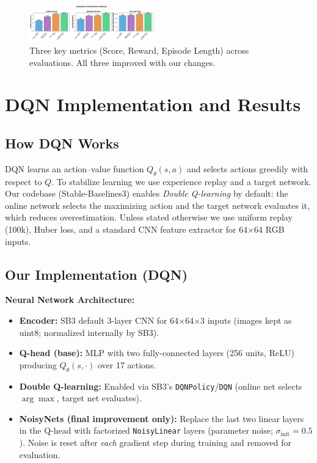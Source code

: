 \documentclass[conference]{IEEEtran}
\begin{document}
\begin{figure}[h!]
\centering
\includegraphics[width=0.48\textwidth]{fig3_summary_metrics.pdf}
\caption{Three key metrics (Score, Reward, Episode Length) across evaluations. All three improved with our changes.}
\label{fig:metrics}
\end{figure}

\section{DQN Implementation and Results}

\subsection{How DQN Works}
DQN learns an action–value function $Q_\theta(s,a)$ and selects actions greedily with respect to $Q$. To stabilize learning we use experience replay and a target network. Our codebase (Stable-Baselines3) enables \emph{Double Q-learning} by default: the online network selects the maximizing action and the target network evaluates it, which reduces overestimation. Unless stated otherwise we use uniform replay (100k), Huber loss, and a standard CNN feature extractor for 64$\times$64 RGB inputs.

\subsection{Our Implementation (DQN)}

\textbf{Neural Network Architecture:}
\begin{itemize}
    \item \textbf{Encoder:} SB3 default 3-layer CNN for 64$\times$64$\times$3 inputs (images kept as uint8; normalized internally by SB3).
    \item \textbf{Q-head (base):} MLP with two fully-connected layers (256 units, ReLU) producing $Q_\theta(s,\cdot)$ over 17 actions.
    \item \textbf{Double Q-learning:} Enabled via SB3’s \texttt{DQNPolicy}/\texttt{DQN} (online net selects $\arg\max$, target net evaluates).
    \item \textbf{NoisyNets (final improvement only):} Replace the last two linear layers in the Q-head with factorized \texttt{NoisyLinear} layers (parameter noise; $\sigma_{\text{init}}{=}0.5$). Noise is reset after \emph{each} gradient step during training and removed for evaluation.
\end{itemize}
\end{document}
